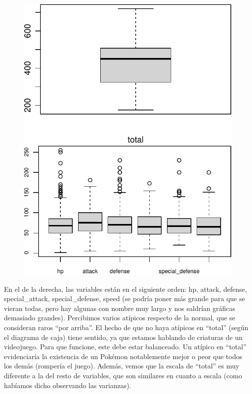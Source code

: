 \documentclass[
  12pt,
]{extreport}
\begin{document}
\begin{figure}

\begin{minipage}{0.50\linewidth}
\begin{center}
\includegraphics{trabajo_files/figure-pdf/unnamed-chunk-11-1.pdf}
\end{center}
\end{minipage}%
%
\begin{minipage}{0.50\linewidth}
\begin{center}
\includegraphics{trabajo_files/figure-pdf/unnamed-chunk-11-2.pdf}
\end{center}
\end{minipage}%

\end{figure}%

En el de la derecha, las variables están en el siguiente orden: hp,
attack, defense, special\_attack, special\_defense, speed (se podría
poner más grande para que se vieran todas, pero hay algunas con nombre
muy largo y nos saldrían gráficas demasiado grandes). Percibimos varios
atípicos respecto de la normal, que se consideran raros ``por arriba''.
El hecho de que no haya atípicos en ``total'' (según el diagrama de
caja) tiene sentido, ya que estamos hablando de criaturas de un
videojuego. Para que funcione, este debe estar balanceado. Un atípico en
``total'' evidenciaría la existencia de un Pokémon notablemente mejor o
peor que todos los demás (rompería el juego). Además, vemos que la
escala de ``total'' es muy diferente a la del resto de variables, que
son similares en cuanto a escala (como habíamos dicho observando las
varianzas).
\end{document}
